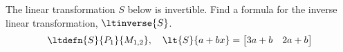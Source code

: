 The linear transformation $S$ below is invertible.  Find a formula for the inverse linear transformation, $\ltinverse{S}$.
%
\begin{equation*}
\ltdefn{S}{P_1}{M_{1,2}},\quad \lt{S}{a+bx}=\begin{bmatrix} 3a+b & 2a+b \end{bmatrix}
\end{equation*}